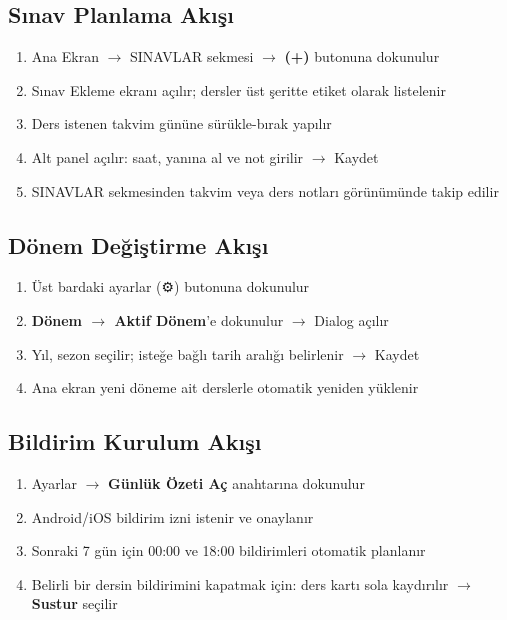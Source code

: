 \documentclass[12pt,a4paper]{article}
\begin{document}
\subsection{Sınav Planlama Akışı}
\begin{enumerate}
    \item Ana Ekran $\rightarrow$ SINAVLAR sekmesi $\rightarrow$ \textbf{(+)} butonuna dokunulur
    \item Sınav Ekleme ekranı açılır; dersler üst şeritte etiket olarak listelenir
    \item Ders istenen takvim gününe sürükle-bırak yapılır
    \item Alt panel açılır: saat, yanına al ve not girilir $\rightarrow$ Kaydet
    \item SINAVLAR sekmesinden takvim veya ders notları görünümünde takip edilir
\end{enumerate}

\subsection{Dönem Değiştirme Akışı}
\begin{enumerate}
    \item Üst bardaki ayarlar (⚙) butonuna dokunulur
    \item \textbf{Dönem $\rightarrow$ Aktif Dönem}'e dokunulur $\rightarrow$ Dialog açılır
    \item Yıl, sezon seçilir; isteğe bağlı tarih aralığı belirlenir $\rightarrow$ Kaydet
    \item Ana ekran yeni döneme ait derslerle otomatik yeniden yüklenir
\end{enumerate}

\subsection{Bildirim Kurulum Akışı}
\begin{enumerate}
    \item Ayarlar $\rightarrow$ \textbf{Günlük Özeti Aç} anahtarına dokunulur
    \item Android/iOS bildirim izni istenir ve onaylanır
    \item Sonraki 7 gün için 00:00 ve 18:00 bildirimleri otomatik planlanır
    \item Belirli bir dersin bildirimini kapatmak için: ders kartı sola kaydırılır $\rightarrow$ \textbf{Sustur} seçilir
\end{enumerate}
\end{document}
